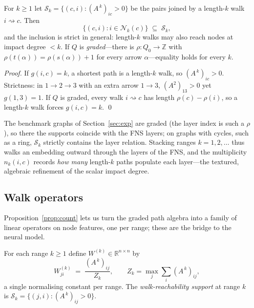 \documentclass[runningheads]{llncs}
\newcommand{\RR}{\mathbb{R}}
\newcommand{\Adj}{A}
\newcommand{\walk}{\rightsquigarrow}
\begin{document}
\begin{proposition}\label{prop:fns}
For $k\ge1$ let $\mathcal{S}_k=\{(c,i):(\Adj^{\,k})_{ic}>0\}$ be the pairs
joined by a length-$k$ walk $i\walk c$. Then
\[
  \{(c,i): i\in \mathcal{N}_k(c)\} \;\subseteq\; \mathcal{S}_k ,
\]
and the inclusion is strict in general: length-$k$ walks may also reach nodes
at impact degree $<k$. If $Q$ is \emph{graded}---there is
$\rho\colon Q_0\to\mathbb{Z}$ with $\rho(t(\alpha))=\rho(s(\alpha))+1$ for
every arrow $\alpha$---equality holds for every $k$.
\end{proposition}

\begin{proof}
If $g(i,c)=k$, a shortest path is a length-$k$ walk, so $(\Adj^{\,k})_{ic}>0$.
Strictness: in $1\to2\to3$ with an extra arrow $1\to3$, $(\Adj^2)_{13}>0$ yet
$g(1,3)=1$. If $Q$ is graded, every walk $i\walk c$ has length
$\rho(c)-\rho(i)$, so a length-$k$ walk forces $g(i,c)=k$. \qed
\end{proof}

The benchmark graphs of Section~\ref{sec:exp} are graded (the layer index is
such a $\rho$), so there the supports coincide with the FNS layers; on graphs
with cycles, such as a ring, $\mathcal{S}_k$ strictly contains the layer
relation. Stacking ranges $k=1,2,\dots$ thus walks an embedding outward through
the layers of the FNS, and the multiplicity $n_k(i,c)$ records \emph{how many}
length-$k$ paths populate each layer---the textured, algebraic refinement of
the scalar impact degree.

\subsection{Walk operators}

Proposition~\ref{prop:count} lets us turn the graded path algebra into a family
of linear operators on node features, one per range; these are the bridge to
the neural model.

\begin{definition}\label{def:walkop}
For each range $k\ge1$ define $W^{(k)}\in\RR^{n\times n}$ by
\[
  W^{(k)}_{j i}\;=\;\frac{(\Adj^{\,k})_{ij}}{\,Z_k\,},
  \qquad Z_k=\max_{j}\sum_i (\Adj^{\,k})_{ij},
\]
a single normalising constant per range. The \emph{walk-reachability support}
at range $k$ is $\mathcal{S}_k=\{(j,i):(\Adj^{\,k})_{ij}>0\}$.
\end{definition}
\end{document}
